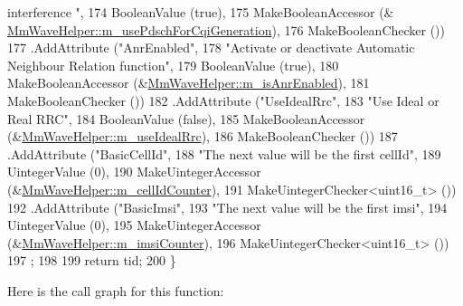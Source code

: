 \begin{DoxyCode}
{       interference  "},
174                            BooleanValue (\textcolor{keyword}{true}),
175                            MakeBooleanAccessor (&
      \hyperlink{classns3_1_1MmWaveHelper_aa22c5cc230f1e0e6bfd280ed2b6f9635}{MmWaveHelper::m\_usePdschForCqiGeneration}),
176                            MakeBooleanChecker ())
177                 .AddAttribute (\textcolor{stringliteral}{"AnrEnabled"},
178                            \textcolor{stringliteral}{"Activate or deactivate Automatic Neighbour Relation function"},
179                            BooleanValue (\textcolor{keyword}{true}),
180                            MakeBooleanAccessor (&\hyperlink{classns3_1_1MmWaveHelper_aca7f0b0f8f8f2898ac833811221d056d}{MmWaveHelper::m\_isAnrEnabled}),
181                            MakeBooleanChecker ())
182                 .AddAttribute (\textcolor{stringliteral}{"UseIdealRrc"},
183                            \textcolor{stringliteral}{"Use Ideal or Real RRC"},
184                            BooleanValue (\textcolor{keyword}{false}),
185                            MakeBooleanAccessor (&\hyperlink{classns3_1_1MmWaveHelper_ad41fdb2996a6f53385b146bb60f476dc}{MmWaveHelper::m\_useIdealRrc}),
186                            MakeBooleanChecker ())
187                 .AddAttribute (\textcolor{stringliteral}{"BasicCellId"},
188                    \textcolor{stringliteral}{"The next value will be the first cellId"},
189                    UintegerValue (0),
190                    MakeUintegerAccessor (&\hyperlink{classns3_1_1MmWaveHelper_a8386109fad3e913312ba2833c0116ea8}{MmWaveHelper::m\_cellIdCounter}),
191                    MakeUintegerChecker<uint16\_t> ())
192             .AddAttribute (\textcolor{stringliteral}{"BasicImsi"},
193                    \textcolor{stringliteral}{"The next value will be the first  imsi"},
194                    UintegerValue (0),
195                    MakeUintegerAccessor (&\hyperlink{classns3_1_1MmWaveHelper_a72100c1c951aa5dcc5b634749e2bb930}{MmWaveHelper::m\_imsiCounter}),
196                    MakeUintegerChecker<uint16\_t> ())
197         ;
198 
199         \textcolor{keywordflow}{return} tid;
200 \}
\end{DoxyCode}


Here is the call graph for this function\+:


